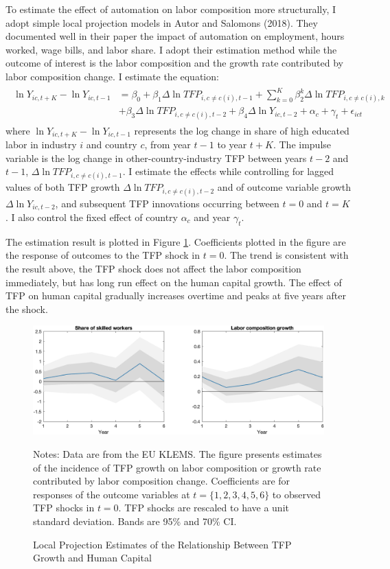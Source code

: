 \documentclass[12pt]{article}
\begin{document}
To estimate the effect of automation on labor composition more structurally, I adopt simple local projection models in Autor and Salomons (2018)\nocite{AutorSalomons2018}. They documented well in their paper the impact of automation on employment, hours worked, wage bills, and labor share. I adopt their estimation method while the outcome of interest is the labor composition and the growth rate contributed by labor composition change. I estimate the equation: 
\begin{align}
\begin{split}
\ln Y_{i c, t+K}-\ln Y_{i c, t-1}&=\beta_{0}+\beta_{1} \Delta \ln TFP_{i, c \neq c(i), t-1}+\sum_{k=0}^{K} \beta_{2}^{k} \Delta \ln TFP_{i, c \neq c(i), k} \\
&+\beta_{3} \Delta \ln T F P_{i, c \neq c(i), t-2}+\beta_{4} \Delta \ln Y_{i c, t-2}+\alpha_{c}+\gamma_{t}+\epsilon_{ict}
\end{split}
\end{align}
where $\ln Y_{i c, t+K}-\ln Y_{i c, t-1}$ represents the log change in share of high educated labor in industry $i$ and country $c$, from year $t-1$ to year $t+K$. The impulse variable is the log change in other-country-industry TFP between years $t-2$ and $t-1$, $\Delta \ln TFP_{i, c \neq c(i), t-1}$. I estimate the effects while controlling for lagged values of both TFP growth $\Delta \ln TFP_{i, c \neq c(i), t-2}$ and of outcome variable growth $\Delta \ln Y_{ic, t-2}$, and subsequent TFP innovations occurring between $t=0$ and $t=K$. I also control the fixed effect of country $\alpha_{c}$ and year $\gamma_{t}$. 

The estimation result is plotted in Figure \ref{LP}. Coefficients plotted in the figure are the response of outcomes to the TFP shock in $t = 0$. The trend is consistent with the result above, the TFP shock does not affect the labor composition immediately, but has long run effect on the human capital growth. The effect of TFP on human capital gradually increases overtime and peaks at five years after the shock. 

\begin{figure}[h!]
\includegraphics[width = \textwidth]{LP}
\caption{Local Projection Estimates of the Relationship Between TFP Growth and Human Capital}
\label{LP}
{\scriptsize Notes: Data are from the EU KLEMS. The figure presents estimates of the incidence of TFP growth on labor composition or growth rate contributed by labor composition change. Coefficients are for responses of the outcome variables at $t = \{1,2,3,4,5,6\}$ to observed TFP shocks in $t = 0$. TFP shocks are rescaled to have a unit standard deviation. Bands are 95\% and 70\% CI.}
\end{figure}
\end{document}
